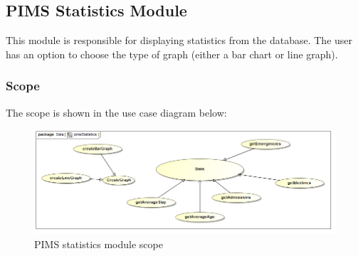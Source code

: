 \subsection{PIMS Statistics Module}
This module is responsible for displaying statistics from the database. The user has an option to choose the type of graph (either a bar chart or line graph). \par 

\subsubsection{Scope}
The scope is shown in the use case diagram below: \par
\begin{figure}[H]
	\centerline{\includegraphics[width=0.7\linewidth]{./Functional_Requirements/Graphics/pimsStats/pimsStatistics}}
	\caption{PIMS statistics module scope}
\end{figure}


